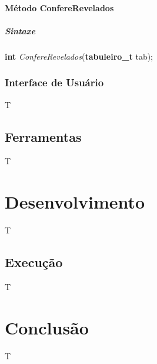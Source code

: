 \documentclass[10pt,a4paper]{report}
\begin{document}
\subsubsection{Método ConfereRevelados}
\paragraph{Sintaxe}
\textbf{int} {\it ConfereRevelados}(\textbf{tabuleiro\_t} tab);
\subsection{Interface de Usuário}
T
\section{Ferramentas}
T
\chapter{Desenvolvimento}
T
\section{Execução}
T
\chapter{Conclusão}
T
\end{document}
